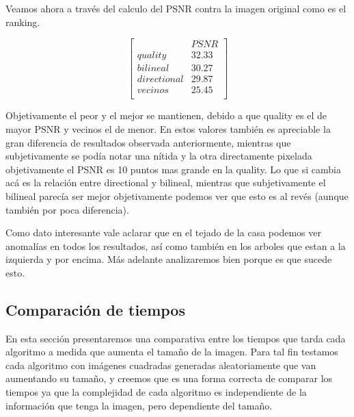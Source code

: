 {Veamos ahora a través del calculo del PSNR contra la imagen original como es el ranking.

$$ 
\begin{bmatrix}
           &      PSNR    \\
       quality    &   32.33   \\
       bilineal    &      30.27   \\
       directional    &      29.87    \\
       vecinos   &      25.45     \\
\end{bmatrix} 
$$

Objetivamente el peor y el mejor se mantienen, debido a que quality es el de mayor PSNR y vecinos el de menor. En estos valores también es apreciable la gran diferencia de resultados observada anteriormente, mientras que subjetivamente se podía notar una nítida y la otra directamente pixelada objetivamente el PSNR es 10 puntos mas grande en la quality. Lo que si cambia acá es la relación entre directional y bilineal, mientras que subjetivamente el bilineal parecía ser mejor objetivamente podemos ver que esto es al revés (aunque también por poca diferencia).

Como dato interesante vale aclarar que en el tejado de la casa podemos ver anomalías en todos los resultados, así como también en los arboles que estan a la izquierda y por encima. Más adelante analizaremos bien porque es que sucede esto.

\newpage

\subsection{Comparación de tiempos}

En esta sección presentaremos una comparativa entre los tiempos que tarda cada algoritmo a medida que aumenta el tamaño de la imagen. Para tal fin testamos cada algoritmo con imágenes cuadradas generadas aleatoriamente que van aumentando su tamaño, y creemos que es una forma correcta de comparar los tiempos ya que la complejidad de cada algoritmo es independiente de la información que tenga la imagen, pero dependiente del tamaño.

}
